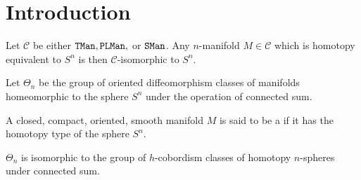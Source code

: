\chapter{Introduction}


\begin{conjecture}\label{conj:generalized_poincare} Let $\mathscr{C}$ be either $\mathtt{TMan}, \mathtt{PLMan},$ or $\mathtt{SMan}$. Any $n$-manifold $M\in \mathscr{C}$ which is homotopy equivalent to $S^n$ is then $\mathscr{C}$-isomorphic to $S^n$.
\end{conjecture}

\begin{definition}
  Let $\Theta_n$ be the group of oriented diffeomorphism classes of manifolds homeomorphic to the sphere $S^n$ under the operation of connected sum.
\end{definition}

\begin{definition}
  A closed, compact, oriented, smooth manifold $M$ is said to be a  if it has the homotopy type of the sphere $S^n$.
\end{definition}

\begin{theorem}
  $\Theta_n$ is isomorphic to the group of $h$-cobordism classes of homotopy $n$-spheres under connected sum.
\end{theorem}

